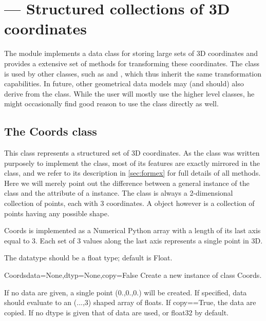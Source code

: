 

\section{ --- Structured collections of 3D coordinates}
\label{sec:coords}



The  module implements a data class for storing large sets of 3D coordinates and provides a extensive set of methods for transforming these coordinates. The  class is used by other classes, such as  and , which thus inherit the same transformation capabilities. In future, other geometrical data models may (and should) also derive from the  class. While the user will mostly use the higher level classes, he might occasionally find good reason to use the  class directly as well.

\subsection{The Coords class}
This class represents a structured set of 3D coordinates.
As the  class was written purposely to implement the  class, most of its features are exactly mirrored in the  class, and we refer to its description in \ref{sec:formex} for full details of all methods. Here we will merely point out the difference between a general instance of the  class and the  attribute of a  instance. 
The  class is always a 2-dimensional collection of  points, each with 3 coordinates. A  object however is a collection of points having any possible shape.

Coords is implemented as a Numerical Python array with a length of its
last axis equal to 3.
Each set of 3 values along the last axis represents a single point in 3D.

The datatype should be a float type; default is Float.

\begin{classdesc}{Coords}{data=None,dtyp=None,copy=False}
Create a new instance of class Coords.

If no data are given, a single point (0.,0.,0.) will be created.
If specified, data should evaluate to an (...,3) shaped array of floats.
If copy==True, the data are copied.
If no dtype is given that of data are used, or float32 by default.

\end{classdesc}


